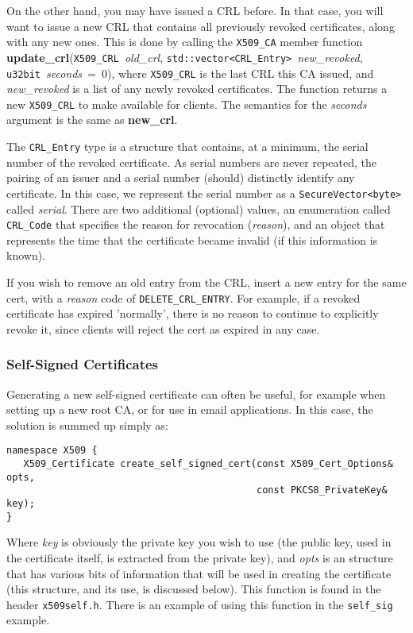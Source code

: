 \documentclass{article}
\newcommand{\filename}[1]{\texttt{#1}}
\newcommand{\function}[1]{\textbf{#1}}
\newcommand{\type}[1]{\texttt{#1}}
\renewcommand{\arg}[1]{\textsl{#1}}
\begin{document}
On the other hand, you may have issued a CRL before. In that case, you will
want to issue a new CRL that contains all previously revoked
certificates, along with any new ones. This is done by calling the
\type{X509\_CA} member function
\function{update\_crl}(\type{X509\_CRL}~\arg{old\_crl},
\type{std::vector<CRL\_Entry>}~\arg{new\_revoked},
\type{u32bit}~\arg{seconds}~=~0), where \type{X509\_CRL} is the last CRL this
CA issued, and \arg{new\_revoked} is a list of any newly revoked certificates.
The function returns a new \type{X509\_CRL} to make available for clients. The
semantics for the \arg{seconds} argument is the same as \function{new\_crl}.

The \type{CRL\_Entry} type is a structure that contains, at a minimum, the
serial number of the revoked certificate. As serial numbers are never repeated,
the pairing of an issuer and a serial number (should) distinctly identify any
certificate. In this case, we represent the serial number as a
\type{SecureVector<byte>} called \arg{serial}. There are two additional
(optional) values, an enumeration called \type{CRL\_Code} that specifies the
reason for revocation (\arg{reason}), and an object that represents the time
that the certificate became invalid (if this information is known).

If you wish to remove an old entry from the CRL, insert a new entry for the
same cert, with a \arg{reason} code of \type{DELETE\_CRL\_ENTRY}. For example,
if a revoked certificate has expired 'normally', there is no reason to continue
to explicitly revoke it, since clients will reject the cert as expired in any
case.

\subsubsection{Self-Signed Certificates}

Generating a new self-signed certificate can often be useful, for example when
setting up a new root CA, or for use in email applications. In this case,
the solution is summed up simply as:

\begin{verbatim}
namespace X509 {
   X509_Certificate create_self_signed_cert(const X509_Cert_Options& opts,
                                            const PKCS8_PrivateKey& key);
}
\end{verbatim}

Where \arg{key} is obviously the private key you wish to use (the public key,
used in the certificate itself, is extracted from the private key), and
\arg{opts} is an structure that has various bits of information that will be
used in creating the certificate (this structure, and its use, is discussed
below). This function is found in the header \filename{x509self.h}. There is an
example of using this function in the \filename{self\_sig} example.
\end{document}
